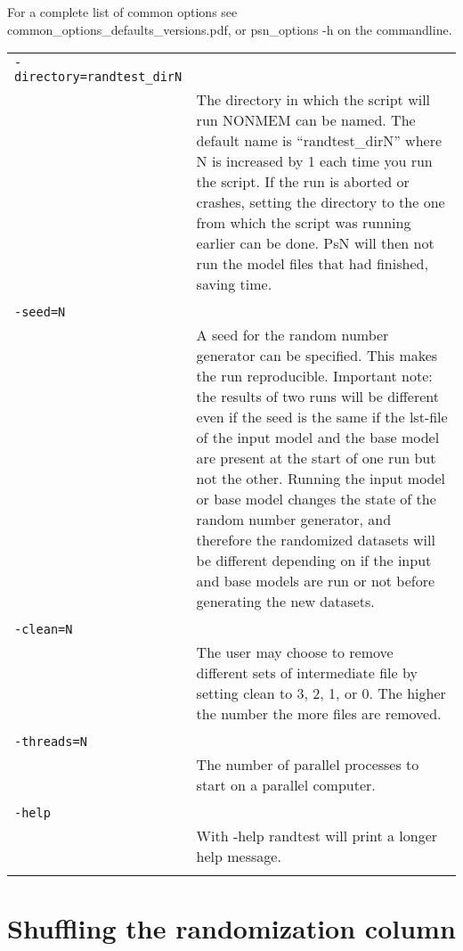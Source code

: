 \documentclass[a4paper,12pt]{article}
\begin{document}
For a complete list of common options see common\_options\_defaults\_versions.pdf, or psn\_options -h on the commandline.

\begin{longtable}{p{1in}p{4in}}
\verb|-directory=randtest_dirN| & \\
\nopagebreak
 & The directory in which the script will run NONMEM can be named. The default name is “randtest\_dirN” where N is increased by 1 each time you run the script. If the run is aborted or crashes, setting the directory to the one from which the script was running earlier can be done. PsN will then not run the model files that had finished, saving time. \\
\\
\verb|-seed=N| & \\
\nopagebreak
 & A seed for the random number generator can be specified. This makes the run reproducible. Important note: the results of two runs will be different even if the seed is the same if the lst-file of the input model and the base model are present at the start of one run but not the other. Running the input model or base model changes the state of the random number generator, and therefore the randomized datasets will be different depending on if the input and base models are run or not before generating the  new datasets. \\
\\
\verb|-clean=N| & \\
\nopagebreak
 & The user may choose to remove different sets of intermediate file by setting clean to 3, 2, 1, or 0. The higher the number the more files are removed. \\
\\
\verb|-threads=N| & \\
\nopagebreak
 & The number of parallel processes to start on a parallel computer. \\
\\
\verb|-help| & \\
\nopagebreak
 & With -help randtest will print a longer help message. \\
\\
\end{longtable}

\section{Shuffling the randomization column}
\end{document}

